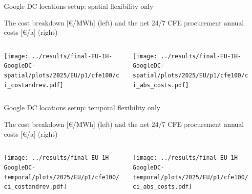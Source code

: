 \begin{frame}{Google DC locations setup: spatial flexibility only}
  
  \centering

  {\footnotesize
  The cost breakdown [\euro/MWh] (left) and the net 24/7 CFE procurement annual costs [\euro/a] (right)
  }
  \vspace{.5cm}

  \begin{columns}
    \begin{column}{8cm}
    \centering
    \texttt{[image: ../results/final-EU-1H-GoogleDC-spatial/plots/2025/EU/p1/cfe100/ci\_costandrev.pdf]}
    \end{column}
    
    \begin{column}{8cm}
      \centering
      \texttt{[image: ../results/final-EU-1H-GoogleDC-spatial/plots/2025/EU/p1/cfe100/ci\_abs\_costs.pdf]}
      \end{column}
    \end{columns}

\end{frame}


\begin{frame}{Google DC locations setup: temporal flexibility only}

  \centering

  {\footnotesize
  The cost breakdown [\euro/MWh] (left) and the net 24/7 CFE procurement annual costs [\euro/a] (right)
  }
  \vspace{.5cm}
  
  \begin{columns}
    \begin{column}{8cm}
    \centering
    \texttt{[image: ../results/final-EU-1H-GoogleDC-temporal/plots/2025/EU/p1/cfe100/ci\_costandrev.pdf]}
    \end{column}
    
    \begin{column}{8cm}
      \centering
      \texttt{[image: ../results/final-EU-1H-GoogleDC-temporal/plots/2025/EU/p1/cfe100/ci\_abs\_costs.pdf]}
      \end{column}
    \end{columns}

\end{frame}


